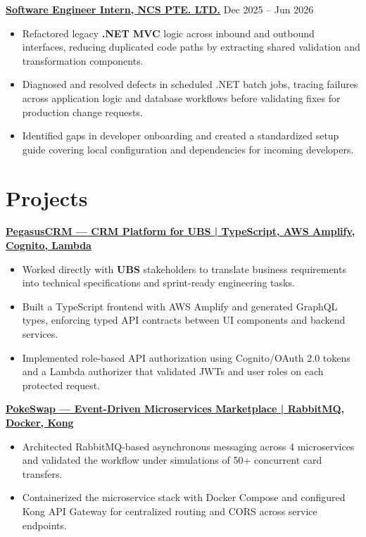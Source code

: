 \documentclass[10pt, letterpaper]{article}
\newenvironment{resumeitemize}{
    \begin{itemize}[
        leftmargin=1.15em,
        itemsep=0.12em,
        topsep=0.12em,
        parsep=0.04em,
        partopsep=0pt
    ]
}{
    \end{itemize}
}
\begin{document}
\href{https://www.ncs.co/en-sg/}{\textbf{Software Engineer Intern, NCS PTE. LTD.}} \hfill Dec 2025 -- Jun 2026

\begin{resumeitemize}
    \item Refactored legacy \textbf{.NET MVC} logic across inbound and outbound interfaces, reducing duplicated code paths by extracting shared validation and transformation components.
    \item Diagnosed and resolved defects in scheduled .NET batch jobs, tracing failures across application logic and database workflows before validating fixes for production change requests.
    \item Identified gaps in developer onboarding and created a standardized setup guide covering local configuration and dependencies for incoming developers.
\end{resumeitemize}

\section{Projects}

\textbf{\href{https://github.com/JabrielHo/CS301-PegasusCRM}{PegasusCRM — CRM Platform for UBS | TypeScript, AWS Amplify, Cognito, Lambda}}

\begin{resumeitemize}
    \item Worked directly with \textbf{UBS} stakeholders to translate business requirements into technical specifications and sprint-ready engineering tasks.
    \item Built a TypeScript frontend with AWS Amplify and generated GraphQL types, enforcing typed API contracts between UI components and backend services.
    \item Implemented role-based API authorization using Cognito/OAuth 2.0 tokens and a Lambda authorizer that validated JWTs and user roles on each protected request.
\end{resumeitemize}

\textbf{\href{https://github.com/leandrogay/PokeSwap}{PokeSwap — Event-Driven Microservices Marketplace | RabbitMQ, Docker, Kong}}

\begin{resumeitemize}
    \item Architected RabbitMQ-based asynchronous messaging across 4 microservices and validated the workflow under simulations of 50+ concurrent card transfers.
    \item Containerized the microservice stack with Docker Compose and configured Kong API Gateway for centralized routing and CORS across service endpoints.
\end{resumeitemize}
\end{document}
